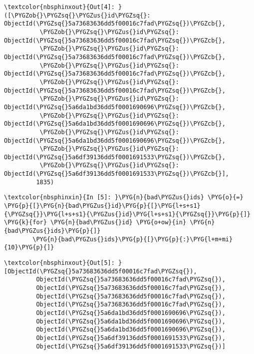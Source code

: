 \documentclass[letterpaper,10pt,english]{sphinxmanual}
\begin{document}
%
\begin{Verbatim}[commandchars=\\\{\}]
\textcolor{nbsphinxout}{Out[4]: }([\PYGZob{}\PYGZsq{}\PYGZus{}id\PYGZsq{}: ObjectId(\PYGZsq{}5a73683636dd5f00016c7fad\PYGZsq{})\PYGZcb{},
          \PYGZob{}\PYGZsq{}\PYGZus{}id\PYGZsq{}: ObjectId(\PYGZsq{}5a73683636dd5f00016c7fad\PYGZsq{})\PYGZcb{},
          \PYGZob{}\PYGZsq{}\PYGZus{}id\PYGZsq{}: ObjectId(\PYGZsq{}5a73683636dd5f00016c7fad\PYGZsq{})\PYGZcb{},
          \PYGZob{}\PYGZsq{}\PYGZus{}id\PYGZsq{}: ObjectId(\PYGZsq{}5a73683636dd5f00016c7fad\PYGZsq{})\PYGZcb{},
          \PYGZob{}\PYGZsq{}\PYGZus{}id\PYGZsq{}: ObjectId(\PYGZsq{}5a73683636dd5f00016c7fad\PYGZsq{})\PYGZcb{},
          \PYGZob{}\PYGZsq{}\PYGZus{}id\PYGZsq{}: ObjectId(\PYGZsq{}5a6da1bd36dd5f0001690696\PYGZsq{})\PYGZcb{},
          \PYGZob{}\PYGZsq{}\PYGZus{}id\PYGZsq{}: ObjectId(\PYGZsq{}5a6da1bd36dd5f0001690696\PYGZsq{})\PYGZcb{},
          \PYGZob{}\PYGZsq{}\PYGZus{}id\PYGZsq{}: ObjectId(\PYGZsq{}5a6da1bd36dd5f0001690696\PYGZsq{})\PYGZcb{},
          \PYGZob{}\PYGZsq{}\PYGZus{}id\PYGZsq{}: ObjectId(\PYGZsq{}5a6df39136dd5f0001691533\PYGZsq{})\PYGZcb{},
          \PYGZob{}\PYGZsq{}\PYGZus{}id\PYGZsq{}: ObjectId(\PYGZsq{}5a6df39136dd5f0001691533\PYGZsq{})\PYGZcb{}],
         1835)
\end{Verbatim}

%
\begin{Verbatim}[commandchars=\\\{\}]
\textcolor{nbsphinxin}{In [5]: }\PYG{n}{bad\PYGZus{}ids} \PYG{o}{=} \PYG{p}{[}\PYG{n}{bad\PYGZus{}id}\PYG{p}{[}\PYG{l+s+s1}{\PYGZsq{}}\PYG{l+s+s1}{\PYGZus{}id}\PYG{l+s+s1}{\PYGZsq{}}\PYG{p}{]} \PYG{k}{for} \PYG{n}{bad\PYGZus{}id} \PYG{o+ow}{in} \PYG{n}{bad\PYGZus{}ids}\PYG{p}{]}
        \PYG{n}{bad\PYGZus{}ids}\PYG{p}{[}\PYG{p}{:}\PYG{l+m+mi}{10}\PYG{p}{]}
\end{Verbatim}

%
\begin{Verbatim}[commandchars=\\\{\}]
\textcolor{nbsphinxout}{Out[5]: }[ObjectId(\PYGZsq{}5a73683636dd5f00016c7fad\PYGZsq{}),
         ObjectId(\PYGZsq{}5a73683636dd5f00016c7fad\PYGZsq{}),
         ObjectId(\PYGZsq{}5a73683636dd5f00016c7fad\PYGZsq{}),
         ObjectId(\PYGZsq{}5a73683636dd5f00016c7fad\PYGZsq{}),
         ObjectId(\PYGZsq{}5a73683636dd5f00016c7fad\PYGZsq{}),
         ObjectId(\PYGZsq{}5a6da1bd36dd5f0001690696\PYGZsq{}),
         ObjectId(\PYGZsq{}5a6da1bd36dd5f0001690696\PYGZsq{}),
         ObjectId(\PYGZsq{}5a6da1bd36dd5f0001690696\PYGZsq{}),
         ObjectId(\PYGZsq{}5a6df39136dd5f0001691533\PYGZsq{}),
         ObjectId(\PYGZsq{}5a6df39136dd5f0001691533\PYGZsq{})]
\end{Verbatim}
\end{document}
